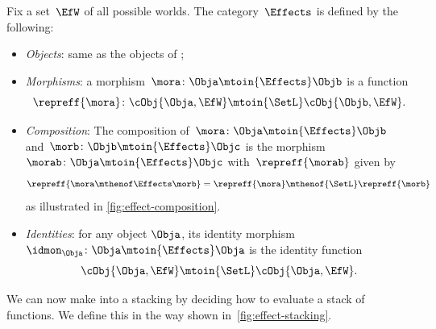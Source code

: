 \begin{definition}
    \label{def:Effects}
    Fix a set~$\EfW$ of all possible worlds.
    The category~$\Effects$ is defined by the following:
    \begin{itemize}
        \item \emph{Objects}: same as the objects of \SetL;
        \item \emph{Morphisms}: a morphism~$\mora\colon \Obja \mtoin{\Effects} \Objb$ is a function
              \begin{equation}
                  \repreff{\mora}\colon \cObj{\Obja, \EfW} \mtoin{\SetL} \cObj{\Objb, \EfW}.
              \end{equation}
        \item \emph{Composition}: The composition of~$\mora\colon \Obja \mtoin{\Effects} \Objb$ and~$\morb\colon \Objb \mtoin{\Effects} \Objc$ is the morphism~$\morab\colon \Obja \mtoin{\Effects} \Objc$ with~$\repreff{\morab}$ given by
              \begin{equation}
                  \repreff{\mora \mthenof \Effects \morb}
                  = \repreff{\mora} \mthenof{\SetL} \repreff{\morb}
              \end{equation}
              as illustrated in \cref{fig:effect-composition}.
        \item \emph{Identities}: for any object $\Obja$, its identity morphism $\idmon_\Obja \colon \Obja \mtoin{\Effects} \Obja$ is the identity function
              \begin{equation}
                  \cObj{\Obja, \EfW} \mtoin{\SetL} \cObj{\Obja, \EfW}.
              \end{equation}
    \end{itemize}
\end{definition}

\begin{marginfigure}
    \centering

    \caption{}
    \label{fig:effect-stacking}
\end{marginfigure}

We can now make \Effects into a stacking  by deciding how to evaluate a stack of functions.
We define this in the way shown in~\cref{fig:effect-stacking}.

